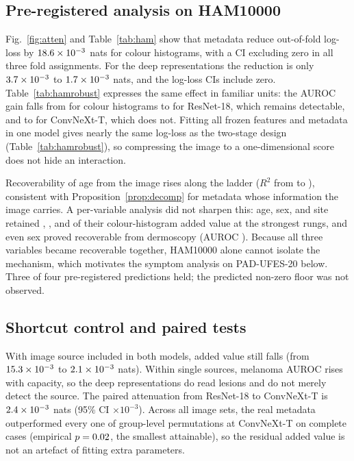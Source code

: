 \documentclass[conference]{IEEEtran}
\begin{document}
\subsection{Pre-registered analysis on HAM10000}\label{sec:ham}

Fig.~\ref{fig:atten} and Table~\ref{tab:ham} show that metadata reduce out-of-fold log-loss by $18.6\times10^{-3}$ nats for colour histograms, with a CI excluding zero in all three fold assignments. For the deep representations the reduction is only $3.7\times10^{-3}$ to $1.7\times10^{-3}$ nats, and the log-loss CIs include zero. Table~\ref{tab:hamrobust} expresses the same effect in familiar units: the AUROC gain falls from \HAMdaucHSV{} \HAMdaucHSVCI{} for colour histograms to \HAMdaucResEighteen{} \HAMdaucResEighteenCI{} for ResNet-18, which remains detectable, and to \HAMdaucConvNeXt{} \HAMdaucConvNeXtCI{} for ConvNeXt-T, which does not. Fitting all frozen features and metadata in one model gives nearly the same log-loss as the two-stage design (Table~\ref{tab:hamrobust}), so compressing the image to a one-dimensional score does not hide an interaction.

Recoverability of age from the image rises along the ladder ($R^2$ from \HAMageRecovHSV{} to \HAMageRecovConvNeXt{}), consistent with Proposition~\ref{prop:decomp} for metadata whose information the image carries. A per-variable analysis did not sharpen this: age, sex, and site retained \HAMretainedAge{}, \HAMretainedSex{}, and \HAMretainedSite{} of their colour-histogram added value at the strongest rungs, and even sex proved recoverable from dermoscopy (AUROC \HAMsexRecovConvNeXt{}). Because all three variables became recoverable together, HAM10000 alone cannot isolate the mechanism, which motivates the symptom analysis on PAD-UFES-20 below. Three of four pre-registered predictions held; the predicted non-zero floor was not observed.



\subsection{Shortcut control and paired tests}\label{sec:shortcut}

With image source included in both models, added value still falls (from $15.3\times10^{-3}$ to $2.1\times10^{-3}$ nats). Within single sources, melanoma AUROC rises with capacity, so the deep representations do read lesions and do not merely detect the source. The paired attenuation from ResNet-18 to ConvNeXt-T is $2.4\times10^{-3}$ nats (95\% CI \HAMpairedRConvCI{}$\times10^{-3}$). Across all \PERMn{} image sets, the real metadata outperformed every one of \PERMR{} group-level permutations at ConvNeXt-T on complete cases (empirical $p=0.02$, the smallest attainable), so the residual added value is not an artefact of fitting extra parameters.
\end{document}
